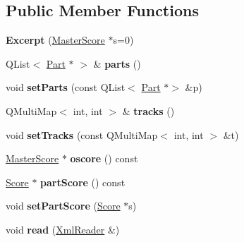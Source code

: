 \subsection*{Public Member Functions}
\begin{DoxyCompactItemize}
\item 
\mbox{\label{class_ms_1_1_excerpt_a750d7a3aca8566a6f6cf0485bb9d6ace}} 
{\bfseries Excerpt} (\hyperlink{class_ms_1_1_master_score}{Master\+Score} $\ast$s=0)
\item 
\mbox{\label{class_ms_1_1_excerpt_a4396fdf230f4563b6c61e67650be49ee}} 
Q\+List$<$ \hyperlink{class_ms_1_1_part}{Part} $\ast$ $>$ \& {\bfseries parts} ()
\item 
\mbox{\label{class_ms_1_1_excerpt_a3a81ea4f8b917ff661e329d163ddda52}} 
void {\bfseries set\+Parts} (const Q\+List$<$ \hyperlink{class_ms_1_1_part}{Part} $\ast$$>$ \&p)
\item 
\mbox{\label{class_ms_1_1_excerpt_ad51403bea37a2e9ab3e1da1a48c5d661}} 
Q\+Multi\+Map$<$ int, int $>$ \& {\bfseries tracks} ()
\item 
\mbox{\label{class_ms_1_1_excerpt_a0f7af4fec67d932ea725902c7ebf9108}} 
void {\bfseries set\+Tracks} (const Q\+Multi\+Map$<$ int, int $>$ \&t)
\item 
\mbox{\label{class_ms_1_1_excerpt_a75a65f7f39bae14bcc016a9906f0beb0}} 
\hyperlink{class_ms_1_1_master_score}{Master\+Score} $\ast$ {\bfseries oscore} () const
\item 
\mbox{\label{class_ms_1_1_excerpt_acd4a10308e373f0d721cfe7caa2b49b5}} 
\hyperlink{class_ms_1_1_score}{Score} $\ast$ {\bfseries part\+Score} () const
\item 
\mbox{\label{class_ms_1_1_excerpt_a0eabdd8062b4b252570df4a797f1c611}} 
void {\bfseries set\+Part\+Score} (\hyperlink{class_ms_1_1_score}{Score} $\ast$s)
\item 
\mbox{\label{class_ms_1_1_excerpt_a94a4951ab2ed99ed891ca086d15f2f7e}} 
void {\bfseries read} (\hyperlink{class_ms_1_1_xml_reader}{Xml\+Reader} \&)
$$
\end{DoxyCompactItemize}
